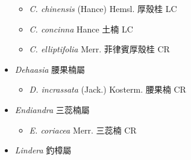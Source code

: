 \begin{itemize}
  \begin{itemize}
        \item[] \textit{C. chinensis} (Hance) Hemsl.  厚殼桂   LC
        \item[] \textit{C. concinna} Hance  土楠   LC
        \item[] \textit{C. elliptifolia} Merr.  菲律賓厚殼桂   CR
  \end{itemize}
 \item[] \textit{Dehaasia} 腰果楠屬
                                
  \begin{itemize}
        \item[] \textit{D. incrassata} (Jack.) Kosterm.  腰果楠   CR
  \end{itemize}
 \item[] \textit{Endiandra} 三蕊楠屬
                                
  \begin{itemize}
        \item[] \textit{E. coriacea} Merr.  三蕊楠   CR
  \end{itemize}
 \item[] \textit{Lindera} 釣樟屬
                                

\end{itemize}
